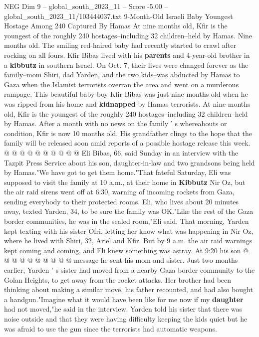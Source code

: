 \begin{textsample}{NEG Dim 9 – global\_south\_2023\_11 – Score -5.00 – global\_south\_2023\_11/103444037.txt}  \label{ex:f9_neg_315}
9-Month-Old Israeli Baby Youngest Hostage Among 240 Captured By Hamas At nine months old, Kfir is the youngest of the roughly 240 hostages--including 32 children--held by Hamas.
Nine months old.
The smiling red-haired baby had recently started to crawl after rocking on all fours.
Kfir Bibas lived with his \textbf{parents} and 4-year-old brother in a \textbf{kibbutz} in southern Israel.
On Oct. 7, their lives were changed forever as the family--mom Shiri, dad Yarden, and the two kids--was abducted by Hamas to Gaza when the Islamist terrorists overran the area and went on a murderous rampage.
This beautiful baby boy Kfir Bibas was just nine months old when he was ripped from his home and \textbf{kidnapped} by Hamas terrorists.
At nine months old, Kfir is the youngest of the roughly 240 hostages--including 32 children--held by Hamas.
After a month with no news on the family ' s whereabouts or condition, Kfir is now 10 months old.
His grandfather clings to the hope that the family will be released soon amid reports of a possible hostage release this week. @ @ @ @ @ @ @ @ @ @ Eli Bibas, 66, said Sunday in an interview with the Tazpit Press Service about his son, daughter-in-law and two grandsons being held by Hamas."We have got to get them home."That fateful Saturday, Eli was supposed to visit the family at 10 a.m., at their home in \textbf{Kibbutz} Nir Oz, but the air raid sirens went off at 6:30, warning of incoming rockets from Gaza, sending everybody to their protected rooms.
Eli, who lives about 20 minutes away, texted Yarden, 34, to be sure the family was OK."Like the rest of the Gaza border communities, he was in the sealed room,"Eli said.
That morning, Yarden kept texting with his sister Ofri, letting her know what was happening in Nir Oz, where he lived with Shiri, 32, Ariel and Kfir.
But by 9 a.m. the air raid warnings kept coming and coming, and Eli knew something was astray.
At 9:20 his son @ @ @ @ @ @ @ @ @ @ message he sent his mom and sister.
Just two months earlier, Yarden ' s sister had moved from a nearby Gaza border community to the Golan Heights, to get away from the rocket attacks.
Her brother had been thinking about making a similar move, his father recounted, and had also bought a handgun."Imagine what it would have been like for me now if my \textbf{daughter} had not moved,"he said in the interview.
Yarden told his sister that there was noise outside and that they were having difficulty keeping the kids quiet but he was afraid to use the gun since the terrorists had automatic weapons.

\end{textsample}
